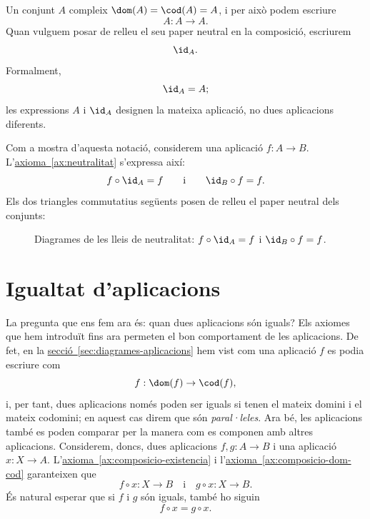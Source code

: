 \begin{notacio}\label{not:identitat-conjunt}
Un conjunt \(A\) compleix \(\dom(A)=\cod(A)=A\), i per això podem escriure
\[
A:A\to A.
\]
Quan vulguem posar de relleu el seu paper neutral en la composició, escriurem
\[
\id_A.
\]
Formalment,
\[
\id_A=A;
\]
les expressions \(A\) i \(\id_A\) designen la mateixa aplicació, no dues aplicacions diferents.
\end{notacio}

Com a mostra d'aquesta notació, considerem una aplicació \(f:A\to B\). L'\hyperref[ax:neutralitat]{axioma~\ref*{ax:neutralitat}} s'expressa així:
\[
f\circ \id_A=f
\qquad\text{i}\qquad
\id_B\circ f=f.
\]
Els dos triangles commutatius següents posen de relleu el paper neutral dels conjunts:

\begin{figure}[H]
  \centering
  \caption{Diagrames de les lleis de neutralitat: \(f\circ\id_A=f\) i \(\id_B\circ f=f\).}
  \label{fig:neutralitat}
\end{figure}

\section{Igualtat d'aplicacions}\label{sec:igualtat-aplicacions}

La pregunta que ens fem ara és: quan dues aplicacions són iguals? Els axiomes que hem introduït fins ara permeten el bon comportament de les aplicacions. De fet, en la \hyperref[sec:diagrames-aplicacions]{secció~\ref*{sec:diagrames-aplicacions}} hem vist com una aplicació \(f\) es podia escriure com 
\[
f:\dom(f) \rightarrow \cod(f),
\]
i, per tant, dues aplicacions només poden ser iguals si tenen el mateix domini i el mateix codomini; en aquest cas direm que són \emph{paral·leles}. Ara bé, les aplicacions també es poden comparar per la manera com es componen amb altres aplicacions. Considerem, doncs, dues aplicacions \(f,g:A\to B\) i una aplicació \(x:X\to A\). L'\hyperref[ax:composicio-existencia]{axioma~\ref*{ax:composicio-existencia}} i l'\hyperref[ax:composicio-dom-cod]{axioma~\ref*{ax:composicio-dom-cod}} garanteixen que
\[
f\circ x:X\rightarrow B \quad \text{i} \quad g\circ x:X\rightarrow B.
\]
És natural esperar que si \(f\) i \(g\) són iguals, també ho siguin
\[
f\circ x=g\circ x.
\]

